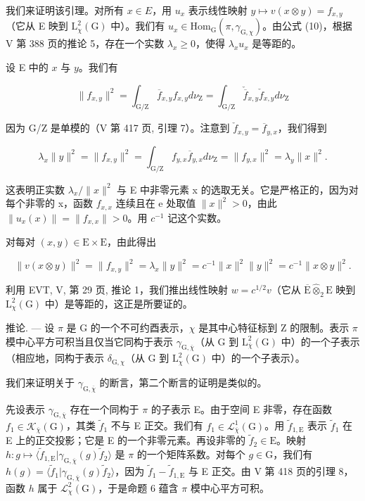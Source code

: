  我们来证明该引理。对所有 \(x \in E\)，用 \(u_{x}\) 表示线性映射 \(y \mapsto v(x \otimes y) = f_{x,y}\)（它从 E 映到 \(\mathrm{L}_{\chi}^{2}(\mathrm{G})\) 中）。我们有 \(u_{x} \in \mathrm{Hom}_{\mathrm{G}}(\pi, \gamma_{\mathrm{G},\chi})\)。由公式 (10)，根据 V 第 388 页的推论 5，存在一个实数 \(\lambda_{x} \geqslant 0\)，使得 \(\lambda_{x}u_{x}\) 是等距的。

设 E 中的 \(x\) 与 \(y\)。我们有

\[
\| f _ {x, y} \| ^ {2} = \int_ {\mathrm{G/Z}} \overline {{f}} _ {x, y} f _ {x, y} d \nu_ {\mathrm{Z}} = \int_ {\mathrm{G/Z}} \check {\overline {{f}}} _ {x, y} \check {f} _ {x, y} d \nu_ {\mathrm{Z}}
\]

因为 G/Z 是单模的（V 第 417 页, 引理 7）。注意到 \(\check{f}_{x,y} = \overline{f}_{y,x}\)，我们得到

\[
\lambda_ {x} \| y \| ^ {2} = \| f _ {x, y} \| ^ {2} = \int_ {\mathrm{G/Z}} f _ {y, x} \overline {{f}} _ {y, x} d \nu_ {\mathrm{Z}} = \| f _ {y, x} \| ^ {2} = \lambda_ {y} \| x \| ^ {2}.
\]

这表明正实数 \(\lambda_{x}/\|x\|^{2}\) 与 E 中非零元素 x 的选取无关。它是严格正的，因为对每个非零的 x，函数 \(f_{x,x}\) 连续且在 e 处取值 \(\|x\|^{2}>0\)，由此 \(\|u_{x}(x)\|=\|f_{x,x}\|>0\)。用 \(c^{-1}\) 记这个实数。

对每对 \((x,y)\in\mathrm{E}\times\mathrm{E}\)，由此得出

\[
\| v (x \otimes y) \| ^ {2} = \| f _ {x, y} \| ^ {2} = \lambda_ {x} \| y \| ^ {2} = c ^ {- 1} \| x \| ^ {2} \| y \| ^ {2} = c ^ {- 1} \| x \otimes y \| ^ {2}.
\]

利用 EVT, V, 第 29 页, 推论 1，我们推出线性映射 \(w = c^{1/2}v\)（它从 \(\overline{\mathrm{E}}\widehat{\otimes}_2\mathrm{E}\) 映到 \(\mathrm{L}_{\chi}^{2}(\mathrm{G})\) 中）是等距的，这正是所要证的。

 推论. --- 设 \(\pi\) 是 G 的一个不可约酉表示，\(\chi\) 是其中心特征标到 Z 的限制。表示 \(\pi\) 模中心平方可积当且仅当它同构于表示 \(\gamma_{\mathrm{G},\overline{\chi}}\)（从 G 到 \(\mathrm{L}_{\overline{\chi}}^{2}(\mathrm{G})\) 中）的一个子表示（相应地，同构于表示 \(\delta_{\mathrm{G},\chi}\)（从 G 到 \(\mathrm{L}_{\chi}^{2}(\mathrm{G})\) 中）的一个子表示）。

我们来证明关于 \(\gamma_{\mathrm{G},\overline{\chi}}\) 的断言，第二个断言的证明是类似的。

 先设表示 \(\gamma_{\mathrm{G},\overline{\chi}}\) 存在一个同构于 \(\pi\) 的子表示 E。由于空间 E 非零，存在函数 \(f_1 \in \mathcal{K}_{\overline{\chi}}(\mathrm{G})\)，其类 \(\widetilde{f}_1\) 不与 E 正交。我们有 \(f_1 \in \mathcal{L}_{\overline{\chi}}^1 (\mathrm{G})\)。用 \(\widetilde{f}_{1,\mathrm{E}}\) 表示 \(\widetilde{f}_1\) 在 E 上的正交投影；它是 E 的一个非零元素。再设非零的 \(\widetilde{f}_2 \in \mathrm{E}\)。映射 \(h: g \mapsto \langle \widetilde{f}_{1,\mathrm{E}} | \gamma_{\mathrm{G},\overline{\chi}}(g)\widetilde{f}_2 \rangle\) 是 \(\pi\) 的一个矩阵系数。对每个 \(g \in \mathrm{G}\)，我们有 \(h(g) = \langle \widetilde{f}_1 | \gamma_{\mathrm{G},\overline{\chi}}(g)\widetilde{f}_2 \rangle\)，因为 \(\widetilde{f}_1 - \widetilde{f}_{1,\mathrm{E}}\) 与 E 正交。由 V 第 418 页的引理 8，函数 \(h\) 属于 \(\mathcal{L}_{\chi}^{2}(\mathrm{G})\)，于是命题 6 蕴含 \(\pi\) 模中心平方可积。

